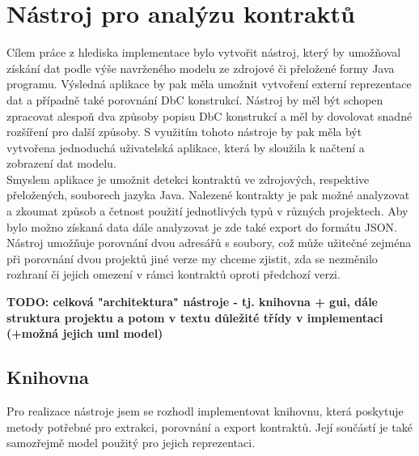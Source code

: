 \chapter{Nástroj pro analýzu kontraktů}
	Cílem práce z hlediska implementace bylo vytvořit nástroj, který by umožňoval získání dat podle výše navrženého modelu ze zdrojové či přeložené formy Java programu. Výsledná aplikace by pak měla umožnit vytvoření externí reprezentace dat a případně také porovnání DbC konstrukcí. Nástroj by měl být schopen zpracovat alespoň dva způsoby popisu DbC konstrukcí a měl by dovolovat snadné rozšíření pro další způsoby. S využitím tohoto nástroje by pak měla být vytvořena jednoduchá uživatelská aplikace, která by sloužila k načtení a zobrazení dat modelu.\\
	
	Smyslem aplikace je umožnit detekci kontraktů ve zdrojových, respektive přeložených, souborech jazyka Java. Nalezené kontrakty je pak možné analyzovat a zkoumat způsob a četnost použití jednotlivých typů v různých projektech. Aby bylo možno získaná data dále analyzovat je zde také export do formátu JSON. Nástroj umožňuje porovnání dvou adresářů s soubory, což může užitečné zejména při porovnání dvou projektů jiné verze my chceme zjistit, zda se nezměnilo rozhraní či jejich omezení v rámci kontraktů oproti předchozí verzi.
	
	
	\textbf{\textcolor{pblue}{TODO: celková "architektura"  nástroje - tj. knihovna + gui, dále  struktura projektu a potom v textu důležité třídy v implementaci  (+možná jejich uml model)}}\\
	
	\section{Knihovna}
		Pro realizace nástroje jsem se rozhodl implementovat knihovnu, která poskytuje metody potřebné pro extrakci, porovnání a export kontraktů. Její součástí je také samozřejmě model použitý pro jejich reprezentaci. 

